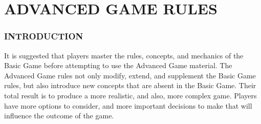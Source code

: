 \section{ADVANCED GAME RULES}

\subsubsection{INTRODUCTION}

It is suggested that players master the rules, concepts, and mechanics of the Basic Game before attempting to use the Advanced Game material. The Advanced Game rules not only modify, extend, and supplement the Basic Game rules, but also introduce new concepts that are absent in the Basic Game. Their total result is to produce a more realistic, and also, more complex game. Players have more options to consider, and more important decisions to make that will influence the outcome of the game.